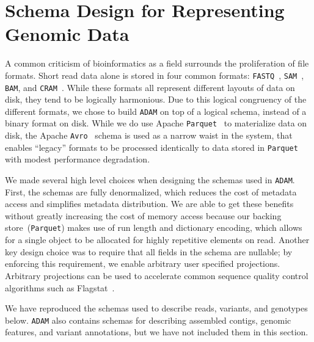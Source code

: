 \documentclass[phd]{ucbthesis}
\begin{document}
\section{Schema Design for Representing Genomic Data}
\label{sec:schema-design}

A common criticism of bioinformatics as a field surrounds the proliferation of file formats. Short read data alone is
stored in four common formats: \texttt{FASTQ}~\cite{cock10}, \texttt{SAM}~\cite{li09}, \texttt{BAM}, and
\texttt{CRAM}~\cite{fritz11}. While these formats all represent different layouts of data on disk, they tend to be
logically harmonious. Due to this logical congruency of the different formats, we chose to build \texttt{ADAM}
on top of a logical schema, instead of a binary format on disk. While we do use Apache \texttt{Parquet}~\cite{parquet} to
materialize data on disk, the Apache \texttt{Avro}~\cite{avro} schema is used as a narrow waist in the system,
that enables ``legacy'' formats to be processed identically to data stored in \texttt{Parquet} with modest performance
degradation.

We made several high level choices when designing the schemas used in \texttt{ADAM}. First, the schemas are fully
denormalized, which reduces the cost of metadata access and simplifies metadata distribution. We are able to
get these benefits without greatly increasing the cost of memory access because our backing store~(\texttt{Parquet})
makes use of run length and dictionary encoding, which allows for a single object to be allocated for highly repetitive
elements on read. Another key design choice was to require that all fields in the schema are nullable; by enforcing
this requirement, we enable arbitrary user specified projections. Arbitrary projections can be used to accelerate
common sequence quality control algorithms such as Flagstat~\cite{massie13, nothaft15}.

We have reproduced the schemas used to describe reads, variants, and genotypes below. \texttt{ADAM} also
contains schemas for describing assembled contigs, genomic features, and variant annotations, but we have
not included them in this section.
\end{document}

